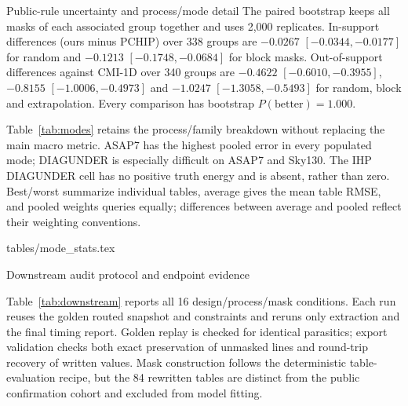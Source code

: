 \documentclass{article}
\makeatletter
\renewcommand{\section}{\@startsection{section}{1}{\z@}
  {-8pt plus -2pt minus -1pt}{4pt}{\large\sc\raggedright}}
\renewcommand{\subsection}{\@startsection{subsection}{2}{\z@}
  {-6pt plus -2pt minus -1pt}{3pt}{\normalsize\sc\raggedright}}
\newcommand{\tabdir}{tables}
\newcommand{\tableinput}[1]{\@@input \tabdir/#1 }
\makeatother
\begin{document}
\subsection{Public-rule uncertainty and process/mode detail}
\label{app:public-detail}
The paired bootstrap keeps all masks of each associated group together and
uses 2,000 replicates. In-support differences (ours minus PCHIP) over 338
groups are $-0.0267$ $[-0.0344,-0.0177]$ for random and $-0.1213$
$[-0.1748,-0.0684]$ for block masks. Out-of-support differences against
CMI-1D over 340 groups are $-0.4622$ $[-0.6010,-0.3955]$,
$-0.8155$ $[-1.0006,-0.4973]$ and $-1.0247$ $[-1.3058,-0.5493]$
for random, block and extrapolation. Every comparison has bootstrap
$P(\mathrm{better})=1.000$.

Table~\ref{tab:modes} retains the process/family breakdown without replacing
the main macro metric. ASAP7 has the highest pooled error in every populated
mode; DIAGUNDER is especially difficult on ASAP7 and Sky130. The IHP
DIAGUNDER cell has no positive truth energy and is absent, rather than zero.
Best/worst summarize individual tables, average gives the mean table RMSE,
and pooled weights queries equally; differences between average and pooled
reflect their weighting conventions.

\begin{table}[htbp]
\centering
\caption{\textbf{Public-rule errors by process and coupling mode.}
30\% block missingness, shown as count:normalized RMSE. Counts denote tables
for best/worst and scored queries for average/pooled, and repeat across
statistics. ``--'' indicates no positive truth energy. Bold marks the lowest
error across processes for each statistic and coupling mode.}
\label{tab:modes}
\tableinput{mode_stats.tex}
\end{table}

\section{Downstream audit protocol and endpoint evidence}
\label{app:downstream}

Table~\ref{tab:downstream} reports all 16 design/process/mask conditions.
Each run reuses the golden routed snapshot and constraints and reruns only
extraction and the final timing report. Golden replay is checked for identical
parasitics; export validation checks both exact preservation of unmasked
lines and round-trip recovery of written values. Mask construction follows
the deterministic table-evaluation recipe, but the 84 rewritten tables are
distinct from the public confirmation cohort and excluded from model fitting.
\end{document}
